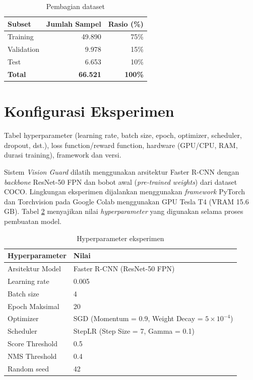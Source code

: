 \documentclass[11pt,a4paper,oneside]{report}
\begin{document}
\begin{table}[h!]
\centering
\caption{Pembagian dataset}
\label{tab:split-data}
\begin{tabular}{lrr}
\toprule
\textbf{Subset} & \textbf{Jumlah Sampel} & \textbf{Rasio (\%)} \\
\midrule
Training   & 49.890 & 75\% \\
Validation & 9.978 & 15\% \\
Test       & 6.653 & 10\% \\
\midrule
\textbf{Total} & \textbf{66.521} & \textbf{100\%} \\
\bottomrule
\end{tabular}
\end{table}

\section{Konfigurasi Eksperimen}
\begin{petunjuk}
Tabel hyperparameter (learning rate, batch size, epoch, optimizer, scheduler, dropout, dst.), loss function/reward function, hardware (GPU/CPU, RAM, durasi training), framework dan versi.
\end{petunjuk}

Sistem \textit{Vision Guard} dilatih menggunakan arsitektur Faster R-CNN dengan \textit{backbone} ResNet-50 FPN dan bobot awal (\textit{pre-trained weights}) dari dataset COCO. Lingkungan eksperimen dijalankan menggunakan \textit{framework} PyTorch dan Torchvision pada Google Colab menggunakan GPU Tesla T4 (VRAM 15.6 GB). Tabel \ref{tab:hyperparam} menyajikan nilai \textit{hyperparameter} yang digunakan selama proses pembuatan model.

\begin{table}[h!]
\centering
\caption{Hyperparameter eksperimen}
\label{tab:hyperparam}
\begin{tabular}{ll}
\toprule
\textbf{Hyperparameter} & \textbf{Nilai} \\
\midrule
Arsitektur Model & Faster R-CNN (ResNet-50 FPN) \\
Learning rate    & 0.005 \\
Batch size       & 4 \\
Epoch Maksimal   & 20 \\
Optimizer        & SGD (Momentum = 0.9, Weight Decay = $5\times10^{-4}$) \\
Scheduler        & StepLR (Step Size = 7, Gamma = 0.1) \\
Score Threshold  & 0.5 \\
NMS Threshold    & 0.4 \\
Random seed      & 42 \\
\bottomrule
\end{tabular}
\end{table}
\end{document}
